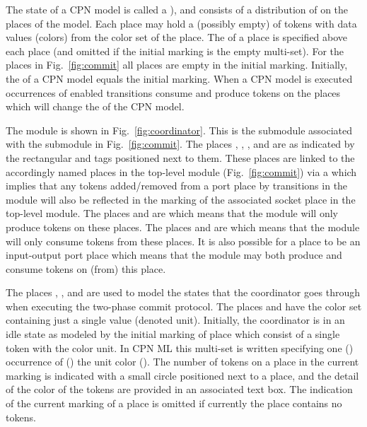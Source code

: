 
The state of a CPN model is called a ), and consists
of a distribution of  on the places of the model. Each
place may hold a (possibly empty)  of tokens with
data values (colors) from the color set of the place. The
 of a place is specified above each place
(and omitted if the initial marking is the empty multi-set). For the
places in Fig.~\ref{fig:commit} all places are empty in the initial
marking. Initially, the  of a CPN model
equals the initial marking. When a CPN model is executed occurrences of
enabled transitions consume and produce tokens on the places which
will change the  of the CPN model.

 

The  module is shown in
Fig.~\ref{fig:coordinator}. This is the submodule associated with the
 submodule in Fig.~\ref{fig:commit}. The places
, , , and
 are  as indicated by the
rectangular  and  tags positioned next to
them. These places are linked to the accordingly named places in the
top-level module (Fig.~\ref{fig:commit}) via a  which implies that any tokens added/removed from a port
place by transitions in the  module will also be
reflected in the marking of the associated socket place in the
top-level module. The places  and
 are  which means that
the  module will only produce tokens on these
places. The places  and  are
 which means that the module will only
consume tokens from these places. It is also possible for a place to
be an input-output port place which means that the module may both
produce and consume tokens on (from) this place.

The places , , and
 are used to model the states that the
coordinator goes through when executing the two-phase commit
protocol. The places  and  have
the color set  containing just a single value
\smlcode{()} (denoted unit). Initially, the coordinator is in an idle
state as modeled by the initial marking of place
 which consist of a single token with the color
unit. In CPN ML this multi-set is written  specifying
one () occurrence of () the unit color
(\smlcode{()}).  The number of tokens on a place in the current
marking is indicated with a small circle positioned next to a place,
and the detail of the color of the tokens are provided in an
associated text box. The indication of the current marking of a place
is omitted if currently the place contains no tokens.

